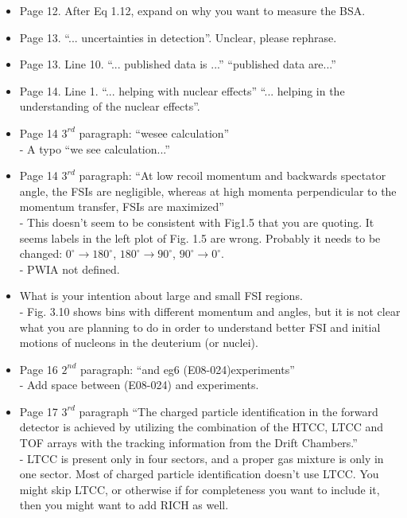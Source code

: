 \begin{itemize}
  \item Page 12. After Eq 1.12, expand on why you want to measure the BSA.
  
  \item Page 13. ``... uncertainties in detection''. Unclear, please rephrase.
  
  \item Page 13. Line 10. ``... published data is ...'' \rarr ``published data are...''
  
  \item Page 14. Line 1. ``... helping with nuclear effects'' \rarr ``... helping in the understanding of the nuclear effects''.
  
  \item Page 14 $3^{rd}$ paragraph: ``wesee calculation''\\
  - A typo ``we see calculation...''
  
  \item Page 14 $3^{rd}$ paragraph: ``At low recoil momentum and
backwards spectator angle, the FSIs are negligible, whereas at high momenta perpendicular
to the momentum transfer, FSIs are maximized'' \\ 
  - This doesn't seem to be consistent with Fig1.5 that you are quoting. It seems labels in the left plot of Fig. 1.5 are wrong. Probably it needs to be changed: $0^{\circ}\rightarrow 180^{\circ}$, $180^{\circ}\rightarrow 90^{\circ}$, $90^{\circ}\rightarrow 0^{\circ}$.\\
  - PWIA not defined.
  
  \item What is your intention about large and small FSI regions. \\
  - Fig. 3.10 shows bins with different momentum and angles, but it is not clear what you are planning to do in order to understand better FSI and initial motions of nucleons in the deuterium (or nuclei).
  
  \item Page 16 $2^{nd}$ paragraph: ``and eg6 (E08-024)experiments'' \\
  - Add space between (E08-024) and experiments.
  
  \item Page 17 $3^{rd}$ paragraph ``The charged particle identification in the forward detector is achieved by utilizing the combination of the HTCC, LTCC and TOF arrays with the tracking information from the Drift Chambers.'' \\
- LTCC is present only in four sectors, and a proper gas mixture is only in one sector. Most of charged particle identification doesn't use LTCC. You might skip LTCC, or otherwise if for completeness you want to include it, then you might want to add RICH as well.



\end{itemize}
